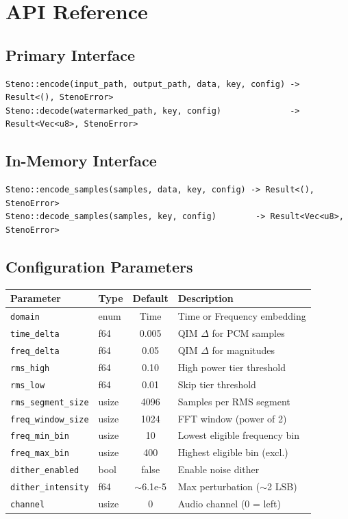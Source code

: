 \documentclass[11pt,a4paper]{article}
\begin{document}
\section{API Reference}
\label{sec:api}

\subsection{Primary Interface}

\begin{lstlisting}[language={}]
Steno::encode(input_path, output_path, data, key, config) -> Result<(), StenoError>
Steno::decode(watermarked_path, key, config)              -> Result<Vec<u8>, StenoError>
\end{lstlisting}

\subsection{In-Memory Interface}

\begin{lstlisting}[language={}]
Steno::encode_samples(samples, data, key, config) -> Result<(), StenoError>
Steno::decode_samples(samples, key, config)        -> Result<Vec<u8>, StenoError>
\end{lstlisting}

\subsection{Configuration Parameters}

\begin{center}
\begin{tabular}{@{}llcl@{}}
\toprule
Parameter & Type & Default & Description \\
\midrule
\texttt{domain} & enum & Time & Time or Frequency embedding \\
\texttt{time\_delta} & f64 & 0.005 & QIM $\Delta$ for PCM samples \\
\texttt{freq\_delta} & f64 & 0.05 & QIM $\Delta$ for magnitudes \\
\texttt{rms\_high} & f64 & 0.10 & High power tier threshold \\
\texttt{rms\_low} & f64 & 0.01 & Skip tier threshold \\
\texttt{rms\_segment\_size} & usize & 4096 & Samples per RMS segment \\
\texttt{freq\_window\_size} & usize & 1024 & FFT window (power of 2) \\
\texttt{freq\_min\_bin} & usize & 10 & Lowest eligible frequency bin \\
\texttt{freq\_max\_bin} & usize & 400 & Highest eligible bin (excl.) \\
\texttt{dither\_enabled} & bool & false & Enable noise dither \\
\texttt{dither\_intensity} & f64 & $\sim$6.1e-5 & Max perturbation ($\sim$2 LSB) \\
\texttt{channel} & usize & 0 & Audio channel (0 = left) \\
\bottomrule
\end{tabular}
\end{center}
\end{document}
